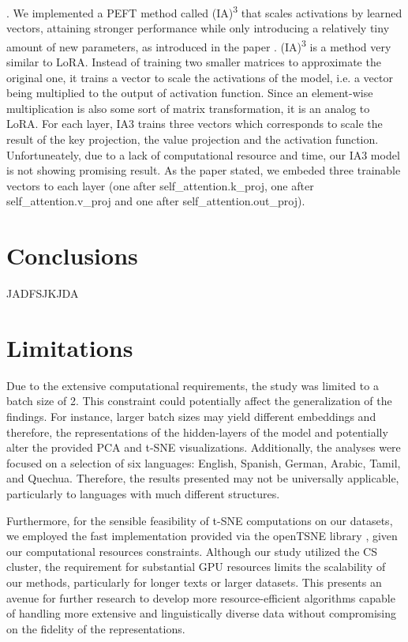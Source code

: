 \documentclass[11pt]{article}
\newcommand{\customsection}[1]{
  \noindent\textbf{#1}.\vspace{2mm}
}
\begin{document}
\customsection{} We implemented a PEFT method called (IA)\textsuperscript{3} that scales activations by learned vectors, attaining stronger performance while only introducing a relatively tiny amount of new parameters, as introduced in the paper \cite{liu2022fewshot}.
(IA)\textsuperscript{3} is a method very similar to LoRA. Instead of training two smaller matrices to approximate the original one,
it trains a vector to scale the activations of the model, i.e. a vector being multiplied to the output of activation function.
Since an element-wise multiplication is also some sort of matrix transformation, it is an analog to LoRA.
For each layer, IA3 trains three vectors which corresponds to scale the result of the key projection, the value projection and the activation function.
Unfortuneately, due to a lack of computational resource and time, our IA3 model is not showing promising result.
As the paper stated, we embeded three trainable vectors to each layer (one after self_attention.k_proj, one after self_attention.v_proj and one after self_attention.out_proj).

\section{Conclusions}

JADFSJKJDA

\section*{Limitations}
Due to the extensive computational requirements, the study was limited to a batch size of 2. This constraint could potentially affect the generalization of the findings. For instance, larger batch sizes may yield different embeddings and therefore, the representations of the hidden-layers of the model and potentially alter the provided PCA and t-SNE visualizations. Additionally, the analyses were focused on a selection of six languages: English, Spanish, German, Arabic, Tamil, and Quechua. Therefore, the results presented may not be universally applicable, particularly to languages with much different structures.

Furthermore, for the sensible feasibility of t-SNE computations on our datasets, we employed the fast implementation provided via the openTSNE library \cite{opentsne}, given our computational resources constraints. Although our study utilized the CS cluster, the requirement for substantial GPU resources limits the scalability of our methods, particularly for longer texts or larger datasets. This presents an avenue for further research to develop more resource-efficient algorithms capable of handling more extensive and linguistically diverse data without compromising on the fidelity of the representations.
\end{document}
